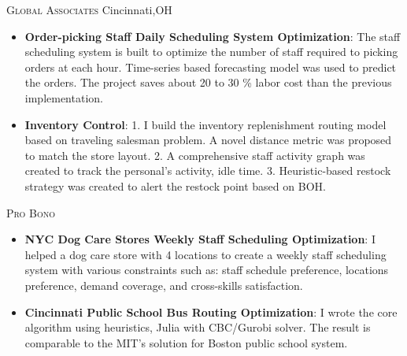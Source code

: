 \documentclass[12pt,letterpaper,roman]{moderncv} %
\begin{document}
\bigskip
{}
{\textsc{Global Associates} }{Cincinnati,OH}{}{}{
\begin{itemize}
\item \textbf{Order-picking Staff Daily Scheduling System Optimization}: 
The staff scheduling system is built to optimize the number of staff required to picking 
orders at each hour. Time-series based forecasting model was used to predict the orders. 
The project saves about  20 to 30 \% labor cost than the previous implementation. 

\item \textbf{Inventory Control}:
1. I build the inventory replenishment routing model based on traveling salesman problem. 
A novel distance metric was proposed to match the store layout. 
2. A comprehensive staff activity graph was created to track the personal's activity, idle time. 
3. Heuristic-based restock strategy was created to alert the restock point based on BOH.


\end{itemize}
}

\bigskip

{\textsc{Pro Bono}}{}{}{}{
\begin{itemize}
\item \textbf{NYC Dog Care Stores Weekly Staff Scheduling Optimization}: I helped a dog 
care store with 4 locations to create a weekly staff scheduling system with various 
constraints such as: staff schedule preference, locations preference, demand coverage, and cross-skills satisfaction. 


\item \textbf{Cincinnati Public School Bus Routing Optimization}: I wrote the core 
 algorithm using heuristics, Julia with CBC/Gurobi solver. The result is comparable to the MIT's solution for Boston public school system.
\end{itemize}
 
}





\end{document}
